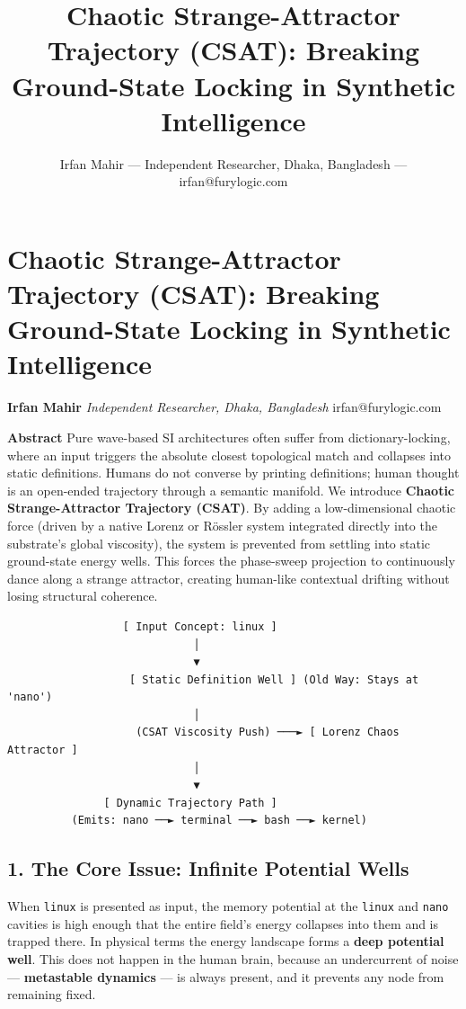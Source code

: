 \documentclass[
  11pt,
  a4paper,
]{article}
\title{Chaotic Strange-Attractor Trajectory (CSAT): Breaking
Ground-State Locking in Synthetic Intelligence}
\author{Irfan Mahir --- Independent Researcher, Dhaka, Bangladesh ---
irfan@furylogic.com}
\date{}
\begin{document}
\maketitle

{
\hypersetup{linkcolor=}
\setcounter{tocdepth}{3}
\tableofcontents
}
\section{Chaotic Strange-Attractor Trajectory (CSAT): Breaking
Ground-State Locking in Synthetic
Intelligence}\label{chaotic-strange-attractor-trajectory-csat-breaking-ground-state-locking-in-synthetic-intelligence}

\textbf{Irfan Mahir} \emph{Independent Researcher, Dhaka, Bangladesh}
irfan@furylogic.com

\textbf{Abstract} Pure wave-based SI architectures often suffer from
dictionary-locking, where an input triggers the absolute closest
topological match and collapses into static definitions. Humans do not
converse by printing definitions; human thought is an open-ended
trajectory through a semantic manifold. We introduce \textbf{Chaotic
Strange-Attractor Trajectory (CSAT)}. By adding a low-dimensional
chaotic force (driven by a native Lorenz or Rössler system integrated
directly into the substrate's global viscosity), the system is prevented
from settling into static ground-state energy wells. This forces the
phase-sweep projection to continuously dance along a strange attractor,
creating human-like contextual drifting without losing structural
coherence.

\begin{verbatim}
                  [ Input Concept: linux ]
                             │
                             ▼
                   [ Static Definition Well ] (Old Way: Stays at 'nano')
                             │
                    (CSAT Viscosity Push) ───► [ Lorenz Chaos Attractor ]
                             │
                             ▼
               [ Dynamic Trajectory Path ]
          (Emits: nano ──► terminal ──► bash ──► kernel)
\end{verbatim}

\subsection{1. The Core Issue: Infinite Potential
Wells}\label{the-core-issue-infinite-potential-wells}

When \texttt{linux} is presented as input, the memory potential at the
\texttt{linux} and \texttt{nano} cavities is high enough that the entire
field's energy collapses into them and is trapped there. In physical
terms the energy landscape forms a \textbf{deep potential well}. This
does not happen in the human brain, because an undercurrent of noise ---
\textbf{metastable dynamics} --- is always present, and it prevents any
node from remaining fixed.
\end{document}
